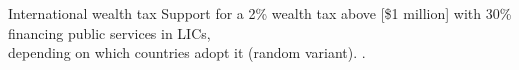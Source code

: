 \documentclass[aspectratio=169,xcolor=dvipsnames, 11pt,mathserif]{beamer}
\begin{document}
\begin{frame}{International wealth tax}
\centering Support for a 2\% wealth tax above [\$1 million] with 30\% financing public services in LICs,\\depending on which countries adopt it (random variant).
.
\end{frame}
\end{document}

